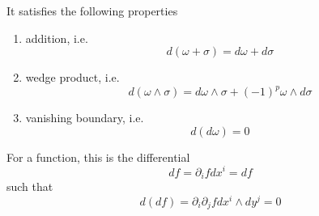    It satisfies the following properties 
    \begin{enumerate}
        \item addition, i.e.
            \begin{equation*}
                d(\omega + \sigma) = d\omega + d\sigma
            \end{equation*}
        \item wedge product, i.e.
            \begin{equation*}
                d(\omega \wedge \sigma) = d\omega \wedge \sigma + (-1)^p \omega \wedge d\sigma
            \end{equation*}
        \item vanishing boundary, i.e.
            \begin{equation*}
                d (d\omega) = 0
            \end{equation*}
    \end{enumerate}

    For a function, this is the differential 
    \begin{equation*}
        df = \partial_i f dx^i = df
    \end{equation*}
    such that 
    \begin{equation*}
        d(df) = \partial_i \partial_j f dx^i \wedge dy^j = 0
    \end{equation*}


